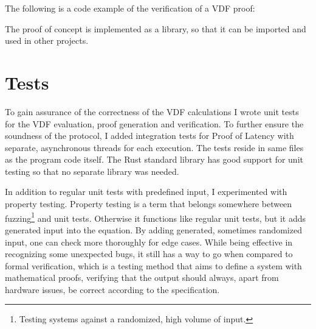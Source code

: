 The following is a code example of the verification of a VDF proof:

The proof of concept is implemented as a library, so that it can be imported and used in other projects.

\section{Tests}
To gain assurance of the correctness of the VDF calculations I wrote unit tests for the VDF evaluation, proof generation and verification. To further ensure the soundness of the protocol, I added integration tests for Proof of Latency with separate, asynchronous threads for each execution. The tests reside in same files as the program code itself. The Rust standard library has good support for unit testing so that no separate library was needed.

In addition to regular unit tests with predefined input, I experimented with property testing. Property testing is a term that belongs somewhere between fuzzing\footnote{Testing systems against a randomized, high volume of input.} and unit tests. Otherwise it functions like regular unit tests, but it adds generated input into the equation. By adding generated, sometimes randomized input, one can check more thoroughly for edge cases. While being effective in recognizing some unexpected bugs, it still has a way to go when compared to formal verification, which is a testing method that aims to define a system with mathematical proofs, verifying that the output should always, apart from hardware issues, be correct according to the specification.

